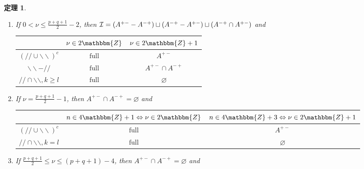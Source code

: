 \documentclass[12pt]{msjproc} %
\newcommand{\assign}{:=}
\newcommand{\tmop}[1]{\ensuremath{\operatorname{#1}}}
\newtheorem{theorem}{定理}
\begin{document}
\begin{versiona}
\begin{theorem}
\begin{enumerate}
\begin{enumerate}
\begin{eqnarray}
        & A^{\noplus \noplus + -} \assign \{ (a, b) \in \mathcal{I} | a - b
        \leqslant - \nu + q - 1 \} &  \nonumber
      \end{eqnarray}
      \item If $0 < \nu \leqslant \frac{p + q + 1}{2} - 2$, then $\mathcal{I}=
      (A^{  + -} - A^{- +}) \sqcup (A^{- +} - A^{+ -}) \sqcup
      (A^{- +} \cap A^{ + -})$ and
      \begin{center}
        \begin{tabular}{|c|c|c|}
          \hline
          & $\nu \in 2\mathbbm{Z}$ & $\nu \in 2\mathbbm{Z}+ 1$\\
          \hline
          $(/ / \cup \backslash\backslash)^c$ & $\tmop{full}$ & $A^{+ -}$\\
          \hline
          $\backslash\backslash - / /$ & $\tmop{full}$ & $A^{+ -} \cap A^{-
          +}$\\
          \hline
          $/ / \cap \backslash\backslash, k \geqslant l$ & $\tmop{full}$ &
          $\varnothing$\\
          \hline
        \end{tabular}
      \end{center}
      \item If $\nu = \frac{p + q + 1}{2} - 1$, then $A^{+ -} \cap A^{- +} =
      \varnothing$ and
      \begin{center}
        \begin{tabular}{|c|c|c|}
          \hline
          & $n \in 4\mathbbm{Z}+ 1 \Leftrightarrow \nu \in 2\mathbbm{Z}$ & $n
          \in 4\mathbbm{Z}+ 3 \Leftrightarrow \nu \in 2\mathbbm{Z}+ 1$\\
          \hline
          $(/ / \cup \backslash\backslash)^c$ & $\tmop{full}$ & $A^{+ -}$\\
          \hline
          $/ / \cap \backslash\backslash, k = l$ & $\tmop{full}$ &
          $\varnothing$\\
          \hline
        \end{tabular}
      \end{center}
      \item If $\frac{p + q + 1}{2} \leqslant \nu \leqslant (p + q + 1) - 4$,
      then $A^{+ -} \cap A^{- +} = \varnothing$ and
      

\end{enumerate}
\end{enumerate}
\end{theorem}
\end{versiona}
\end{document}
